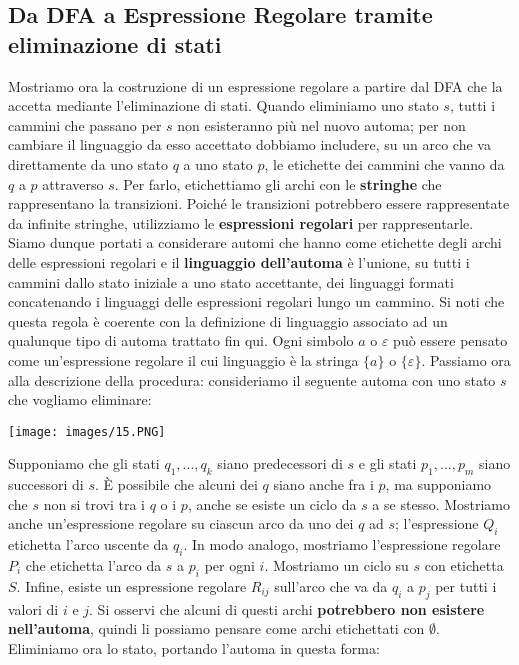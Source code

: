 \documentclass[12pt]{article}
\begin{document}
\subsection{Da DFA a Espressione Regolare tramite eliminazione di stati}
Mostriamo ora la costruzione di un espressione regolare a partire dal DFA che la accetta mediante l'eliminazione di stati. Quando eliminiamo uno stato $s$, tutti i cammini che passano per $s$ non esisteranno più nel nuovo automa; per non cambiare il linguaggio da esso accettato dobbiamo includere, su un arco che va direttamente da uno stato $q$ a uno stato $p$, le etichette dei cammini che vanno da $q$ a $p$ attraverso $s$. Per farlo, etichettiamo gli archi con le \textbf{stringhe} che rappresentano la transizioni. Poiché le transizioni potrebbero essere rappresentate da infinite stringhe, utilizziamo le \textbf{espressioni regolari} per rappresentarle. Siamo dunque portati a considerare automi che hanno come etichette degli archi delle espressioni regolari e il \textbf{linguaggio dell'automa} è l'unione, su tutti i cammini dallo stato iniziale a uno stato accettante, dei linguaggi formati concatenando i linguaggi delle espressioni regolari lungo un cammino. Si noti che questa regola è coerente con la definizione di linguaggio associato ad un qualunque tipo di automa trattato fin qui. Ogni simbolo $a$ o $\varepsilon$ può essere pensato come un'espressione regolare il cui linguaggio è la stringa $\{a\}$ o $\{\varepsilon\}$. Passiamo ora alla descrizione della procedura: consideriamo il seguente automa con uno stato $s$ che vogliamo eliminare:
\begin{center}
    \texttt{[image: images/15.PNG]}
\end{center}
Supponiamo che gli stati $q_1, ..., q_k$ siano predecessori di $s$ e gli stati $p_1, ..., p_m$ siano successori di $s$. È possibile che alcuni dei $q$ siano anche fra i $p$, ma supponiamo che $s$ non si trovi tra i $q$ o i $p$, anche se esiste un ciclo da $s$ a se stesso. Mostriamo anche un'espressione regolare su ciascun arco da uno dei $q$ ad $s$; l'espressione $Q_i$ etichetta l'arco uscente da $q_i$. In modo analogo, mostriamo l'espressione regolare $P_i$ che etichetta l'arco da $s$ a $p_i$ per ogni $i$. Mostriamo un ciclo su $s$ con etichetta $S$. Infine, esiste un espressione regolare $R_{ij}$ sull'arco che va da $q_i$ a $p_j$ per tutti i valori di $i$ e $j$. Si osservi che alcuni di questi archi \textbf{potrebbero non esistere nell'automa}, quindi li possiamo pensare come archi etichettati con $\emptyset$. Eliminiamo ora lo stato, portando l'automa in questa forma:
\end{document}
